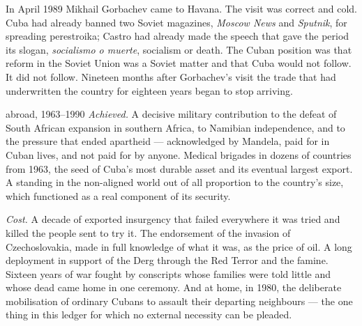 In April 1989 Mikhail Gorbachev came to Havana. The visit was correct and cold.
Cuba had already banned two Soviet magazines, \emph{Moscow News} and
\emph{Sputnik}, for spreading perestroika; Castro had already made the speech
that gave the period its slogan, \emph{socialismo o muerte}, socialism or
death. The Cuban position was that reform in the Soviet Union was a Soviet
matter and that Cuba would not follow. It did not follow. Nineteen months after
Gorbachev's visit the trade that had underwritten the country for eighteen
years began to stop arriving.

\begin{ledger}{abroad, 1963--1990}
\emph{Achieved.} A decisive military contribution to the defeat of South
African expansion in southern Africa, to Namibian independence, and to the
pressure that ended apartheid --- acknowledged by Mandela, paid for in Cuban
lives, and not paid for by anyone. Medical brigades in dozens of countries from
1963, the seed of Cuba's most durable asset and its eventual largest export.
A standing in the non-aligned world out of all proportion to the country's
size, which functioned as a real component of its security.

\emph{Cost.} A decade of exported insurgency that failed everywhere it was
tried and killed the people sent to try it. The endorsement of the invasion of
Czechoslovakia, made in full knowledge of what it was, as the price of oil. A
long deployment in support of the Derg through the Red Terror and the famine.
Sixteen years of war fought by conscripts whose families were told little and
whose dead came home in one ceremony. And at home, in 1980, the deliberate
mobilisation of ordinary Cubans to assault their departing neighbours ---
the one thing in this ledger for which no external necessity can be pleaded.
\end{ledger}
